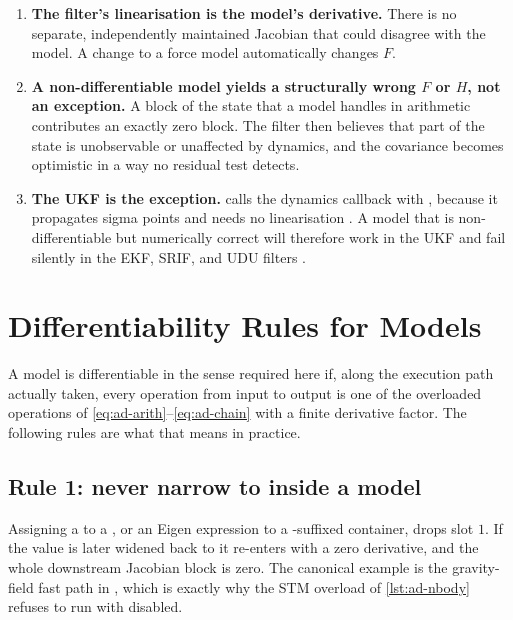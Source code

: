 \begin{enumerate}[leftmargin=1.5cm]
  \item \textbf{The filter's linearisation is the model's derivative.} There
    is no separate, independently maintained Jacobian that could disagree with
    the model. A change to a force model automatically changes $F$.
  \item \textbf{A non-differentiable model yields a structurally wrong $F$ or
    $H$, not an exception.} A block of the state that a model handles in
     arithmetic contributes an exactly zero block. The filter then
    believes that part of the state is unobservable or unaffected by dynamics,
    and the covariance becomes optimistic in a way no residual test detects.
  \item \textbf{The UKF is the exception.}  calls the
    dynamics callback with , because it propagates sigma
    points and needs no linearisation \citep{julier2004ukf}. A model that is
    non-differentiable but numerically correct will therefore work in the UKF
    and fail silently in the EKF, SRIF, and UDU filters
    \citep{bierman1977, thornton1980}.
\end{enumerate}

\section{Differentiability Rules for Models}
\label{sec:ad-rules}

A model is differentiable in the sense required here if, along the execution
path actually taken, every operation from input to output is one of the
overloaded  operations of
\cref{eq:ad-arith}--\cref{eq:ad-chain} with a finite derivative factor. The
following rules are what that means in practice.

\subsection{Rule 1: never narrow to  inside a model}

Assigning a  to a , or an Eigen  expression to
a -suffixed container, drops slot $1$. If the value is later widened
back to  it re-enters with a zero derivative, and the whole
downstream Jacobian block is zero. The canonical example is the gravity-field
fast path in , which is exactly why the STM
overload of \cref{lst:ad-nbody} refuses to run with  disabled.

